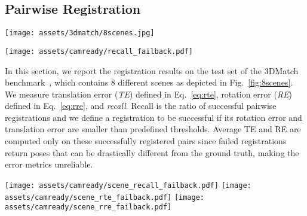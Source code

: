 \documentclass[10pt,twocolumn,letterpaper]{article}
\begin{document}
\subsection{Pairwise Registration}

\begin{figure*}[ht!]
    \centering
    \small    
    \texttt{[image: assets/3dmatch/8scenes.jpg]}        
    \caption{Global registration results of our method on all 8 different test scenes in 3DMatch~\cite{zeng20163dmatch}. Best viewed in color.}
    \label{fig:8scenes}
\end{figure*}

\begin{figure*}
    \centering
    \texttt{[image: assets/camready/recall\_failback.pdf]}
    \small
    \caption{Overall pairwise registration recall (y-axis) on the 3DMatch benchmark with varying rotation (left image) and translation (right image) error thresholds (x-axis). Our approach outperforms baseline methods for all thresholds while being  faster than the most accurate baseline.}
    \label{fig:3dmatch-recall}
\end{figure*}


In this section, we report the registration results on the test set of the 3DMatch benchmark~\cite{zeng20163dmatch}, which contains 8 different scenes as depicted in Fig.~\ref{fig:8scenes}.
We measure translation error (\textit{TE}) defined in Eq.~\ref{eq:rte}, rotation error (\textit{RE}) defined in Eq.~\ref{eq:rre}, and \textit{recall}. Recall is the ratio of successful pairwise registrations and we define a registration to be successful if its rotation error and translation error are smaller than predefined thresholds.
Average TE and RE are computed only on these successfully registered pairs since failed registrations return poses that can be drastically different from the ground truth, making the error metrics unreliable.

\begin{figure*}[ht!]
    \centering
    \small
    \texttt{[image: assets/camready/scene\_recall\_failback.pdf]}    
    \texttt{[image: assets/camready/scene\_rte\_failback.pdf]}        
    \texttt{[image: assets/camready/scene\_rre\_failback.pdf]}    
    \caption{Analysis of 3DMatch registration results per scene. \textit{Row 1}: recall rate (higher is better). \textit{Row 2-3}: TE and RE measured on successfully registered pairs (lower is better). Our method is consistently better on all scenes, which were not seen during training. Note: a missing bar corresponds to zero successful alignments in a scene.}
    \label{fig:scene-stats}
\end{figure*}
\end{document}
